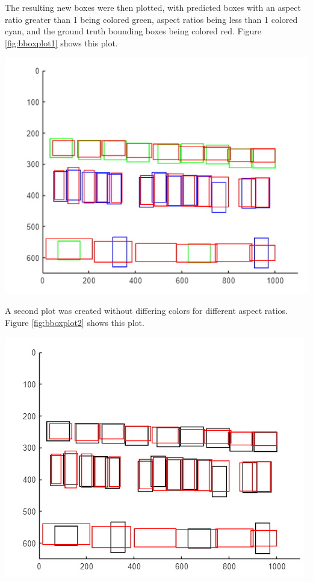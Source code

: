 \documentclass[man]{apa7}
\begin{document}
The resulting new boxes were then plotted, with predicted boxes with an aspect ratio greater than 1 being colored green, aspect ratios being less than 1 colored cyan, and the ground truth bounding boxes being colored red. Figure \ref{fig:bboxplot1} shows this plot.

\newpage

\begin{minipage}{\linewidth}
  \includegraphics[height=\textheight/4,width=\textwidth/2]{figures/finalBbox1.png}
  \label{fig:bboxplot1}
\end{minipage}

A second plot was created without differing colors for different aspect ratios. Figure \ref{fig:bboxplot2} shows this plot.

\begin{minipage}{\linewidth}
  \includegraphics[height=\textheight/4,width=\textwidth/2]{figures/bboxplot2.png}
  \label{fig:bboxplot2}
\end{minipage}
\end{document}
